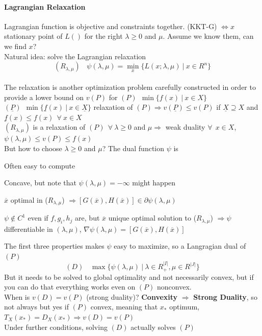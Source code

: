 \documentclass[10pt]{report}
\begin{document}
\paragraph{Lagrangian Relaxation} Lagrangian function is objective and constraints together. (KKT-G) $\Leftrightarrow x$ stationary point of $L()$ for the right $\lambda\geq 0$ and $\mu$. Assume we know them, can we find $x$?\\
Natural idea: solve the Lagrangian relaxation $$(R_{\lambda,\mu})\:\:\:\:\psi(\lambda,\mu) = \min_x\{L(x;\lambda, \mu)\:|\:x\in R^n\}$$\\
The relaxation is another optimization problem carefully constructed in order to provide a lower bound on $v(P)$ for $(P)\:\:\min\{f(x)\:|\:x\in X\}$\\
$(\underline{P})\:\:\min\{\underline{f}(x)\:|\:x\in \underline{X}\}$ relaxation of $(P) \Rightarrow v(\underline{P})\leq v(P)$ if $\underline{X}\supseteq X$ and $\underline{f}(x)\leq f(x)\:\:\forall\:x\in X$\\
$(R_{\lambda,\mu})$ is a relaxation of $(P)\:\:\forall\:\lambda\geq 0$ and $\mu\Rightarrow$ weak duality $\forall\:\:x\in X$, $\psi(\lambda,\mu)\leq v(P)\leq f(x)$\\
But how to choose $\lambda\geq 0$ and $\mu$? The dual function $\psi$ is \begin{list}{}{}
	\item Often easy to compute
	\item Concave, but note that $\psi(\lambda,\mu)=-\infty$ might happen
	\item $\overline{x}$ optimal in ($R_{\lambda,\mu}$) $\Rightarrow [G(\overline{x}), H(\overline{x})]\in \partial\psi(\lambda,\mu)$
	\item $\psi\not\in C^1$ even if $f,g_i,h_j$ are, but $\overline{x}$ unique optimal solution to ($R_{\lambda,\mu}$) $\Rightarrow \psi$ differentiable in $(\lambda, \mu)$, $\nabla \psi(\lambda, \mu)= [G(\overline{x}), H(\overline{x})]$
\end{list}
The first three properties makes $\psi$ easy to maximize, so a Langragian dual of $(P)$ $$(D)\:\:\:\:\max\{\psi(\lambda,\mu)\:|\:\lambda\in R_+^{|I|},\mu\in R^{|J|}\}$$ But it needs to be solved to global optimality and not necessarily convex, but if you can do that everything works even on $(P)$ nonconvex.\\
When is $v(D) = v(P)$ (strong duality)?  \textbf{Convexity} $\Rightarrow$ \textbf{Strong Duality}, so not always but yes if $(P)$ convex, meaning that $x_*$ optimum, $T_X(x_*)=D_X(x_*)\Rightarrow v(D) = v(P)$\\
Under further conditions, solving $(D)$ actually solves $(P)$
\end{document}
